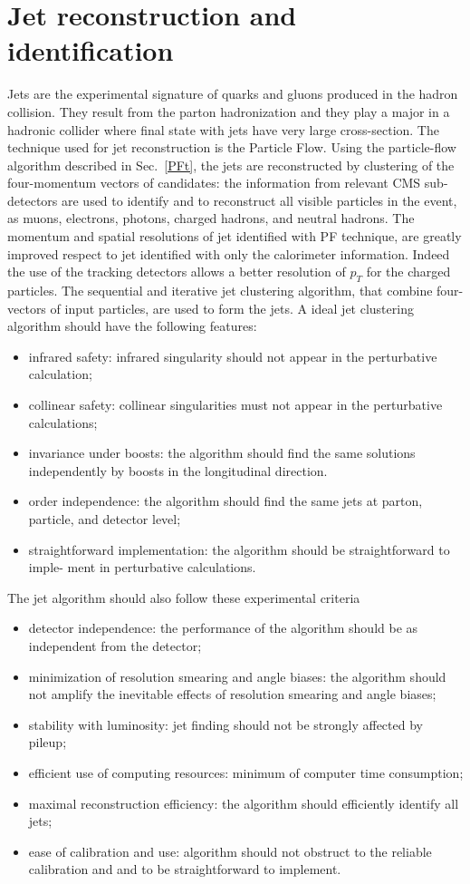 \section{Jet reconstruction and identification}
Jets are the experimental signature of quarks and gluons produced in the hadron collision. They result from the parton  hadronization and they play a major in a hadronic collider where final state with jets have very large cross-section. The technique used for jet reconstruction is the Particle Flow.
Using the particle-flow algorithm described in Sec.~\ref{PFt}, the  jets are reconstructed by clustering of the  four-momentum vectors of candidates: the information from relevant CMS sub-detectors are used to identify and to reconstruct all visible particles in the event, as
 muons, electrons, photons, charged hadrons, and neutral hadrons. 
The momentum and spatial resolutions of jet identified with PF technique, are greatly improved respect to jet identified with only the calorimeter information. Indeed the use of the tracking detectors allows a better resolution of $p_T$ for the charged particles.
The sequential and iterative jet clustering algorithm, that combine four-vectors of input particles, are used to form the jets.
A ideal jet clustering algorithm should have the following features:
\begin{itemize}
\item infrared safety: infrared singularity should not appear in the perturbative calculation;
\item collinear safety: collinear singularities must not appear in the perturbative calculations;
\item invariance under boosts: the algorithm should find the same solutions independently
by boosts in the longitudinal direction.
\item order independence: the algorithm should find the same jets at parton, particle, and detector level;
\item straightforward implementation: the algorithm should be straightforward to imple-
ment in perturbative calculations.
\end{itemize}
The jet algorithm should also follow these  experimental criteria
\begin{itemize}
\item detector independence: the performance of the algorithm should be as independent from the detector;
\item minimization of resolution smearing and angle biases: the algorithm should not
amplify the inevitable effects of resolution smearing and angle biases;
\item stability with luminosity: jet finding should not be strongly affected by pileup;
\item efficient use of computing resources: minimum of computer time consumption;
\item maximal reconstruction efficiency: the algorithm should efficiently identify all jets;
\item ease of calibration and use: algorithm should not obstruct to the reliable calibration and and to be straightforward to implement.
\end{itemize}
